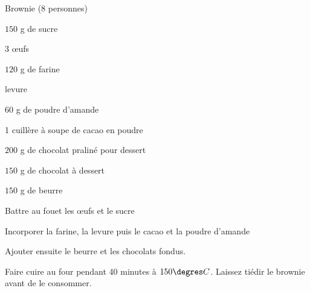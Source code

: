 \begin{recette}{Brownie (8 personnes)}
\begin{ingredients}
\item $150$ g de sucre
\item 3 œufs
\item $120$ g de farine
\item levure
\item $60$ g de poudre d'amande
\item 1 cuillère à soupe de cacao en poudre
\item $200$ g de chocolat praliné pour dessert
\item $150$ g de chocolat à dessert
\item $150$ g de beurre
\end{ingredients}

\begin{preparation}
\item Battre au fouet les œufs et le sucre
\item Incorporer la farine, la levure puis le cacao et la poudre d'amande
\item Ajouter ensuite le beurre et les chocolats fondus.
\end{preparation}

\begin{cuisson}
Faire cuire au four pendant 40 minutes à $150\degres C$. Laissez tiédir le brownie avant de le consommer.
\end{cuisson}
\end{recette}

